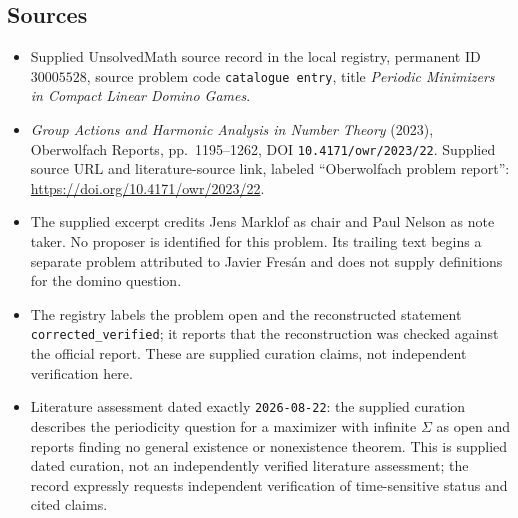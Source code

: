 \documentclass[11pt]{article}
\begin{document}
\subsection{Sources}
\begin{itemize}
\item Supplied UnsolvedMath source record in the local registry, permanent ID \(30005528\), source problem code \texttt{catalogue entry}, title \emph{Periodic Minimizers in Compact Linear Domino Games}.
\item \emph{Group Actions and Harmonic Analysis in Number Theory} (2023), Oberwolfach Reports, pp.\ 1195--1262, DOI \texttt{10.4171/owr/2023/22}. Supplied source URL and literature-source link, labeled ``Oberwolfach problem report'': \url{https://doi.org/10.4171/owr/2023/22}.
\item The supplied excerpt credits Jens Marklof as chair and Paul Nelson as note taker. No proposer is identified for this problem. Its trailing text begins a separate problem attributed to Javier Fres\'an and does not supply definitions for the domino question.
\item The registry labels the problem open and the reconstructed statement \texttt{corrected\_verified}; it reports that the reconstruction was checked against the official report. These are supplied curation claims, not independent verification here.
\item Literature assessment dated exactly \texttt{2026-08-22}: the supplied curation describes the periodicity question for a maximizer with infinite \(\Sigma\) as open and reports finding no general existence or nonexistence theorem. This is supplied dated curation, not an independently verified literature assessment; the record expressly requests independent verification of time-sensitive status and cited claims.
\end{itemize}
\end{document}
